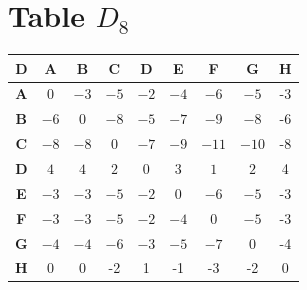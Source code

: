 \documentclass{article}
\begin{document}
\section{Table $D_{8}$}
\begin{center}
    \begin{tabular}{|c||c|c|c|c|c|c|c|c|}
        \hline
        \textbf{D} & \textbf{A} & \textbf{B} & \textbf{C} & \textbf{D} & \textbf{E} & \textbf{F} & \textbf{G} & \textbf{H} \\
        \hline
        \hline
        \textbf{A}& 0 & \cellcolor[HTML]{D74894}$-3$ & \cellcolor[HTML]{D74894}$-5$ & \cellcolor[HTML]{D74894}$-2$ & \cellcolor[HTML]{D74894}$-4$ & \cellcolor[HTML]{D74894}$-6$ & \cellcolor[HTML]{D74894}$-5$ & -3 \\
        \hline
        \textbf{B}& \cellcolor[HTML]{D74894}$-6$ & 0 & \cellcolor[HTML]{D74894}$-8$ & \cellcolor[HTML]{D74894}$-5$ & \cellcolor[HTML]{D74894}$-7$ & \cellcolor[HTML]{D74894}$-9$ & \cellcolor[HTML]{D74894}$-8$ & -6 \\
        \hline
        \textbf{C}& \cellcolor[HTML]{D74894}$-8$ & \cellcolor[HTML]{D74894}$-8$ & 0 & \cellcolor[HTML]{D74894}$-7$ & \cellcolor[HTML]{D74894}$-9$ & \cellcolor[HTML]{D74894}$-11$ & \cellcolor[HTML]{D74894}$-10$ & -8 \\
        \hline
        \textbf{D}& \cellcolor[HTML]{D74894}$4$ & \cellcolor[HTML]{D74894}$4$ & \cellcolor[HTML]{D74894}$2$ & 0 & \cellcolor[HTML]{D74894}$3$ & \cellcolor[HTML]{D74894}$1$ & \cellcolor[HTML]{D74894}$2$ & 4 \\
        \hline
        \textbf{E}& \cellcolor[HTML]{D74894}$-3$ & \cellcolor[HTML]{D74894}$-3$ & \cellcolor[HTML]{D74894}$-5$ & \cellcolor[HTML]{D74894}$-2$ & 0 & \cellcolor[HTML]{D74894}$-6$ & \cellcolor[HTML]{D74894}$-5$ & -3 \\
        \hline
        \textbf{F}& \cellcolor[HTML]{D74894}$-3$ & \cellcolor[HTML]{D74894}$-3$ & \cellcolor[HTML]{D74894}$-5$ & \cellcolor[HTML]{D74894}$-2$ & \cellcolor[HTML]{D74894}$-4$ & 0 & \cellcolor[HTML]{D74894}$-5$ & -3 \\
        \hline
        \textbf{G}& \cellcolor[HTML]{D74894}$-4$ & \cellcolor[HTML]{D74894}$-4$ & \cellcolor[HTML]{D74894}$-6$ & \cellcolor[HTML]{D74894}$-3$ & \cellcolor[HTML]{D74894}$-5$ & \cellcolor[HTML]{D74894}$-7$ & 0 & -4 \\
        \hline
        \textbf{H}& 0 & 0 & -2 & 1 & -1 & -3 & -2 & 0 \\
        \hline
    \end{tabular}
\end{center}
\end{document}
